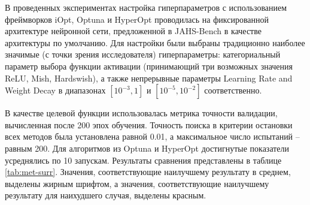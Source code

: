 \documentclass[a4paper,12pt,russian]{article}
\begin{document}
В проведенных  экспериментах настройка гиперпараметров с использованием фреймворков iOpt, Optuna и HyperOpt проводилась на фиксированной архитектуре нейронной сети, предложенной в JAHS-Bench в качестве архитектуры по умолчанию. Для настройки были выбраны традиционно наиболее значимые (с точки зрения исследователя) гиперпараметры: категориальный параметр выбора функции активации (принимающий три возможных значения ReLU, Mish, Hardswish), а также непрерывные параметры Learning Rate and Weight Decay в диапазонах $[10^{-3},1]$ и $[10^{-5},10^{-2}]$ соответственно.

В качестве целевой функции использовалась метрика точности валидации, вычисленная после 200 эпох обучения. Точность поиска в критерии остановки всех методов была установлена равной 0.01, а максимальное число испытаний -- равным 200. Для алгоритмов из Optuna и HyperOpt достигнутые показатели усреднялись по 10 запускам. Результаты сравнения представлены в таблице \ref{tab:met-surr}. Значения, соответствующие наилучшему результату в среднем, выделены жирным шрифтом, а значения, соответствующие наилучшему результату для наихудшего случая, выделены красным.

\begin{table}[h!]
\centering
\caption{Значения оптимизированных метрик для алгоритмов, усредненные по 10 запускам (суррогатные модели)}
\label{tab:met-surr}
\end{table}
\end{document}
